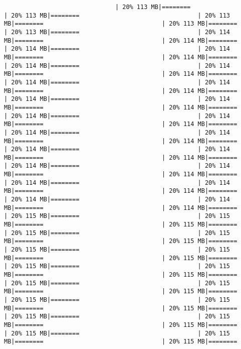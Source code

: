 \documentclass[
]{article}
\begin{document}
\begin{verbatim}
                               | 20% 113 MB|========                                 | 20% 113 MB|========                                 | 20% 113 MB|========                                 | 20% 113 MB|========                                 | 20% 113 MB|========                                 | 20% 114 MB|========                                 | 20% 114 MB|========                                 | 20% 114 MB|========                                 | 20% 114 MB|========                                 | 20% 114 MB|========                                 | 20% 114 MB|========                                 | 20% 114 MB|========                                 | 20% 114 MB|========                                 | 20% 114 MB|========                                 | 20% 114 MB|========                                 | 20% 114 MB|========                                 | 20% 114 MB|========                                 | 20% 114 MB|========                                 | 20% 114 MB|========                                 | 20% 114 MB|========                                 | 20% 114 MB|========                                 | 20% 114 MB|========                                 | 20% 114 MB|========                                 | 20% 114 MB|========                                 | 20% 114 MB|========                                 | 20% 114 MB|========                                 | 20% 114 MB|========                                 | 20% 114 MB|========                                 | 20% 114 MB|========                                 | 20% 114 MB|========                                 | 20% 114 MB|========                                 | 20% 114 MB|========                                 | 20% 114 MB|========                                 | 20% 114 MB|========                                 | 20% 114 MB|========                                 | 20% 114 MB|========                                 | 20% 114 MB|========                                 | 20% 115 MB|========                                 | 20% 115 MB|========                                 | 20% 115 MB|========                                 | 20% 115 MB|========                                 | 20% 115 MB|========                                 | 20% 115 MB|========                                 | 20% 115 MB|========                                 | 20% 115 MB|========                                 | 20% 115 MB|========                                 | 20% 115 MB|========                                 | 20% 115 MB|========                                 | 20% 115 MB|========                                 | 20% 115 MB|========                                 | 20% 115 MB|========                                 | 20% 115 MB|========                                 | 20% 115 MB|========                                 | 20% 115 MB|========                                 | 20% 115 MB|========                                 | 20% 115 MB|========                                 | 20% 115 MB|========                                 | 20% 115 MB|========                                 | 20% 115 MB|========                                 | 20% 115 MB|========                                 | 20% 115 MB|========                           
\end{verbatim}
\end{document}
